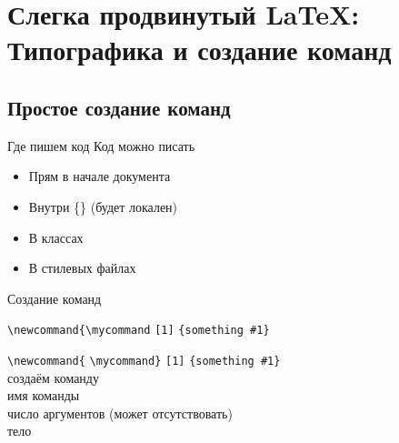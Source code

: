 
\section{Слегка продвинутый \LaTeX: Типографика и создание команд}
\subsection{Простое создание команд}


\begin{frame}{Где пишем код}\relax
     Код можно писать 
     \begin{itemize}
         \item Прям в начале документа
         \item Внутри \{\} (будет локален)
         \item В классах
         \item В стилевых файлах
     \end{itemize}
\end{frame}


\begin{frame}[fragile]{Создание команд}\relax
    
    \footnotesize
     \begin{tabbing}
     
        \lstinline|\newcommand{|\= \lstinline|\mycommand| \= \lstinline|[1]|  \=  \lstinline|{something #1}|\kill

        \lstinline|\newcommand{|\> \lstinline|\mycommand}| \> \lstinline|[1]|  \>  \lstinline|{something #1}| \\ \footnotesize
        создаём команду\>  \>   \>  \\ 
        \>\footnotesize имя команды \>   \>  \\ 
        \>  \>\footnotesize число аргументов (может  отсутствовать)  \>  \\
        \>  \>  \>\footnotesize тело \\
    \end{tabbing}
    
    \cprotect{}
\end{frame}


